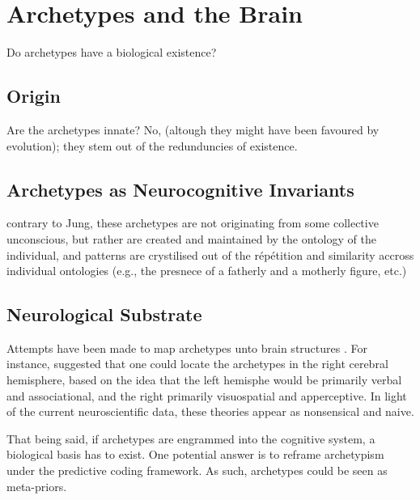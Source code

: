 \documentclass[]{book}
\begin{document}
\hypertarget{archetypes-and-the-brain}{%
\chapter{Archetypes and the Brain}\label{archetypes-and-the-brain}}

Do archetypes have a biological existence?

\hypertarget{origin}{%
\section{Origin}\label{origin}}

Are the archetypes innate? No, (altough they might have been favoured by evolution); they stem out of the redunduncies of existence.

\hypertarget{archetypes-as-neurocognitive-invariants}{%
\section{Archetypes as Neurocognitive Invariants}\label{archetypes-as-neurocognitive-invariants}}

contrary to Jung, these archetypes are not originating from some collective unconscious, but rather are created and maintained by the ontology of the individual, and patterns are crystilised out of the répétition and similarity accross individual ontologies (e.g., the presnece of a fatherly and a motherly figure, etc.)

\hypertarget{neurological-substrate}{%
\section{Neurological Substrate}\label{neurological-substrate}}

Attempts have been made to map archetypes unto brain structures \citep{samuels2003jung}. For instance, \citet{rossi1977cerebral} suggested that one could locate the archetypes in the right cerebral hemisphere, based on the idea that the left hemisphe would be primarily verbal and associational, and the right primarily visuospatial and apperceptive. In light of the current neuroscientific data, these theories appear as nonsensical and naive.

That being said, if archetypes are engrammed into the cognitive system, a biological basis has to exist. One potential answer is to reframe archetypism under the predictive coding framework. As such, archetypes could be seen as meta-priors.
\end{document}
